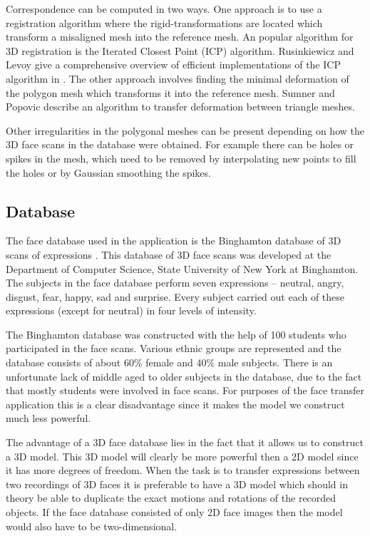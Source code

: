 \documentclass[11pt,a4paper]{report}
\begin{document}
Correspondence can be computed in two ways. One approach is to use a registration algorithm where the rigid-transformations are located
which transform a misaligned mesh into the reference mesh. An popular algorithm
for 3D registration is the Iterated Closest Point (ICP) algorithm. Rusinkiewicz
and Levoy give a comprehensive overview of efficient implementations of the ICP
algorithm in \cite{ICP}. The other approach involves finding the minimal deformation of
the polygon mesh which transforms it into the reference mesh. Sumner and Popovic \cite{deformTri}
describe an algorithm to transfer deformation between triangle meshes.

Other irregularities in the polygonal meshes can be present depending on how the
3D face scans in the database were obtained. For example there can be holes or spikes in the
mesh, which need to be removed by interpolating new points to fill the holes or
by Gaussian smoothing the spikes. 

\subsection{Database}
The face database used in the application is the Binghamton database of 3D
scans of expressions \cite{binghamton}. This database of 3D face scans was developed at the Department of
Computer Science, State University of New York at Binghamton. The subjects 
in the face database perform seven expressions -- neutral, angry,
disgust, fear, happy, sad and surprise. Every subject carried out each of these
expressions (except for neutral) in four levels of intensity. 

The Binghamton database was constructed with the help of 100 students who participated in the face
scans. Various ethnic groups are represented and the database consists of about
60\% female and 40\% male subjects. There is an unfortunate lack of middle aged to older
 subjects in the database, due to the fact that mostly students were
involved in face scans. For purposes of the face transfer application this is a clear
disadvantage since it makes the model we construct much less powerful.

The advantage of a 3D face database lies in the fact that it allows us to
construct a 3D model. This 3D model will clearly be more powerful then a 2D
model since it has more degrees of freedom. When the task is to transfer
expressions between two recordings of 3D faces it is preferable to have a 3D model
which should in theory be able to duplicate the exact motions and rotations of the recorded
objects. If the face database consisted of only 2D face images then the model
would also have to be two-dimensional.
\end{document}

